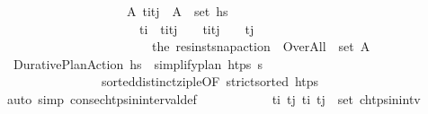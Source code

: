 \begin{isabellebody}
\ \ \ \ \ \ \ \ \ \ \ \ \ \ \ \ \ \ \ \ {\isacharparenleft}{\kern0pt}{\isasymexists}A{\isachardot}{\kern0pt}\ {\isacharparenleft}{\kern0pt}{\isacharparenleft}{\kern0pt}t\isactrlsub i{\isacharplus}{\kern0pt}t\isactrlsub j{\isacharparenright}{\kern0pt}\ {\isacharslash}{\kern0pt}\ {}{\isacharcomma}{\kern0pt}A{\isacharparenright}{\kern0pt}\ {\isasymin}\ set\ hs\ {\isasymand}\ \isanewline
\ \ \ \ \ \ \ \ \ \ \ \ \ \ \ \ \ \ \ \ \ \ t\isactrlsub i\ {\isacharless}{\kern0pt}\ {\isacharparenleft}{\kern0pt}t\isactrlsub i{\isacharplus}{\kern0pt}t\isactrlsub j{\isacharparenright}{\kern0pt}\ {\isacharslash}{\kern0pt}\ {}\ {\isasymand}\ {\isacharparenleft}{\kern0pt}t\isactrlsub i{\isacharplus}{\kern0pt}t\isactrlsub j{\isacharparenright}{\kern0pt}\ {\isacharslash}{\kern0pt}\ {}\ {\isacharless}{\kern0pt}\ t\isactrlsub j\ {\isasymand}\ \isanewline
\ \ \ \ \ \ \ \ \ \ \ \ \ \ \ \ \ \ \ \ \ \ \ \ {\isacharparenleft}{\kern0pt}the\ {\isacharparenleft}{\kern0pt}res{\isacharunderscore}{\kern0pt}inst{\isacharunderscore}{\kern0pt}snap{\isacharunderscore}{\kern0pt}action\ {\isasympi}{\isacharprime}{\kern0pt}\ Over{\isacharunderscore}{\kern0pt}All{\isacharparenright}{\kern0pt}{\isacharparenright}{\kern0pt}\ {\isasymin}\ set\ A{\isacharparenright}{\kern0pt}{\isachardoublequoteclose}\isanewline
\ \ \ \ \ \ \ \ \ \ \isamarkupfalse%
\ {}\ Durative{\isacharunderscore}{\kern0pt}Plan{\isacharunderscore}{\kern0pt}Action\ {\isacartoucheopen}hs\ {\isacharequal}{\kern0pt}\ simplify{\isacharunderscore}{\kern0pt}plan\ htps\ {\isacharparenleft}{\kern0pt}{\isasympi}{\isacharhash}{\kern0pt}{\isasympi}s{\isacharparenright}{\kern0pt}{\isacartoucheclose}\ \isanewline
\ \ \ \ \ \ \ \ \ \ \ \ \ \ \ \ sorted{\isacharunderscore}{\kern0pt}distinct{\isacharunderscore}{\kern0pt}zip{\isacharunderscore}{\kern0pt}le{\isacharbrackleft}{\kern0pt}OF\ {\isacartoucheopen}strict{\isacharunderscore}{\kern0pt}sorted\ htps{\isacartoucheclose}{\isacharbrackright}{\kern0pt}\isanewline
\ \ \ \ \ \ \ \ \ \ \isamarkupfalse%
\ {\isacharparenleft}{\kern0pt}auto\ simp{\isacharcolon}{\kern0pt}\ consec{\isacharunderscore}{\kern0pt}htps{\isacharunderscore}{\kern0pt}in{\isacharunderscore}{\kern0pt}interval{\isacharunderscore}{\kern0pt}def{\isacharparenright}{\kern0pt}\isanewline
\ \ \ \ \ \ \ \ \isamarkupfalse%
\ \isamarkupfalse%
\ {\isachardoublequoteopen}{\isasymforall}t\isactrlsub i\ t\isactrlsub j{\isachardot}{\kern0pt}\ {\isacharparenleft}{\kern0pt}t\isactrlsub i{\isacharcomma}{\kern0pt}\ t\isactrlsub j{\isacharparenright}{\kern0pt}\ {\isasymin}\ set\ {\isacharquery}{\kern0pt}chtps{\isacharunderscore}{\kern0pt}in{\isacharunderscore}{\kern0pt}intv\ {\isasymlongrightarrow}\ \isanewline

\end{isabellebody}
